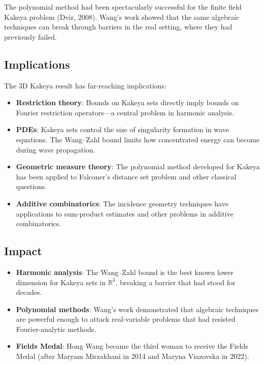 \begin{highlightbox}
The polynomial method had been spectacularly successful for the finite field Kakeya problem (Dvir, 2008). Wang's work showed that the same algebraic techniques can break through barriers in the real setting, where they had previously failed.
\end{highlightbox}

\subsection{Implications}
The 3D Kakeya result has far-reaching implications:

\begin{itemize}
\item \textbf{Restriction theory}: Bounds on Kakeya sets directly imply bounds on Fourier restriction operators---a central problem in harmonic analysis.
\item \textbf{PDEs}: Kakeya sets control the size of singularity formation in wave equations. The Wang--Zahl bound limits how concentrated energy can become during wave propagation.
\item \textbf{Geometric measure theory}: The polynomial method developed for Kakeya has been applied to Falconer's distance set problem and other classical questions.
\item \textbf{Additive combinatorics}: The incidence geometry techniques have applications to sum-product estimates and other problems in additive combinatorics.
\end{itemize}

\subsection{Impact}
\begin{itemize}
\item \textbf{Harmonic analysis}: The Wang--Zahl bound is the best known lower dimension for Kakeya sets in $\mathbb{R}^3$, breaking a barrier that had stood for decades.
\item \textbf{Polynomial methods}: Wang's work demonstrated that algebraic techniques are powerful enough to attack real-variable problems that had resisted Fourier-analytic methods.
\item \textbf{Fields Medal}: Hong Wang became the third woman to receive the Fields Medal (after Maryam Mirzakhani in 2014 and Maryna Viazovska in 2022).
\end{itemize}


